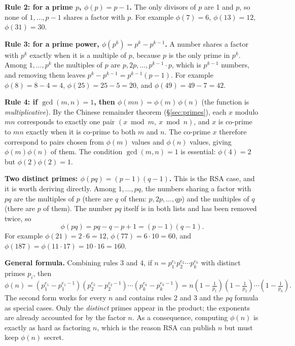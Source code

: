 \textbf{Rule 2: for a prime $p$, $\phi(p) = p - 1$.} The only divisors of $p$ are 1 and $p$, so none of $1, \dots, p - 1$ shares a factor with $p$. For example $\phi(7) = 6$, $\phi(13) = 12$, $\phi(31) = 30$.

\textbf{Rule 3: for a prime power, $\phi(p^k) = p^k - p^{k-1}$.} A number shares a factor with $p^k$ exactly when it is a multiple of $p$, because $p$ is the only prime in $p^k$. Among $1, \dots, p^k$ the multiples of $p$ are $p, 2p, \dots, p^{k-1}\cdot p$, which is $p^{k-1}$ numbers, and removing them leaves $p^k - p^{k-1} = p^{k-1}(p-1)$. For example $\phi(8) = 8 - 4 = 4$, $\phi(25) = 25 - 5 = 20$, and $\phi(49) = 49 - 7 = 42$.

\textbf{Rule 4: if $\gcd(m, n) = 1$, then $\phi(mn) = \phi(m)\,\phi(n)$} (the function is \emph{multiplicative}). By the Chinese remainder theorem (\S\ref{sec:primes}), each $x$ modulo $mn$ corresponds to exactly one pair $(x \bmod m,\ x \bmod n)$, and $x$ is co-prime to $mn$ exactly when it is co-prime to both $m$ and $n$. The co-prime $x$ therefore correspond to pairs chosen from $\phi(m)$ values and $\phi(n)$ values, giving $\phi(m)\phi(n)$ of them. The condition $\gcd(m, n) = 1$ is essential: $\phi(4) = 2$ but $\phi(2)\phi(2) = 1$.

\textbf{Two distinct primes: $\phi(pq) = (p-1)(q-1)$.} This is the RSA case, and it is worth deriving directly. Among $1, \dots, pq$, the numbers sharing a factor with $pq$ are the multiples of $p$ (there are $q$ of them: $p, 2p, \dots, qp$) and the multiples of $q$ (there are $p$ of them). The number $pq$ itself is in both lists and has been removed twice, so
\[
\phi(pq) = pq - q - p + 1 = (p-1)(q-1).
\]
For example $\phi(21) = 2 \cdot 6 = 12$, $\phi(77) = 6 \cdot 10 = 60$, and $\phi(187) = \phi(11 \cdot 17) = 10 \cdot 16 = 160$.

\textbf{General formula.} Combining rules 3 and 4, if $n = p_1^{e_1} p_2^{e_2} \cdots p_k^{e_k}$ with distinct primes $p_i$, then
\[
\phi(n) = \left(p_1^{e_1} - p_1^{e_1-1}\right)\left(p_2^{e_2} - p_2^{e_2-1}\right)\cdots\left(p_k^{e_k} - p_k^{e_k-1}\right)
= n\left(1 - \tfrac{1}{p_1}\right)\left(1 - \tfrac{1}{p_2}\right)\cdots\left(1 - \tfrac{1}{p_k}\right).
\]
The second form works for every $n$ and contains rules 2 and 3 and the $pq$ formula as special cases. Only the \emph{distinct} primes appear in the product; the exponents are already accounted for by the factor $n$. As a consequence, computing $\phi(n)$ is exactly as hard as factoring $n$, which is the reason RSA can publish $n$ but must keep $\phi(n)$ secret.

